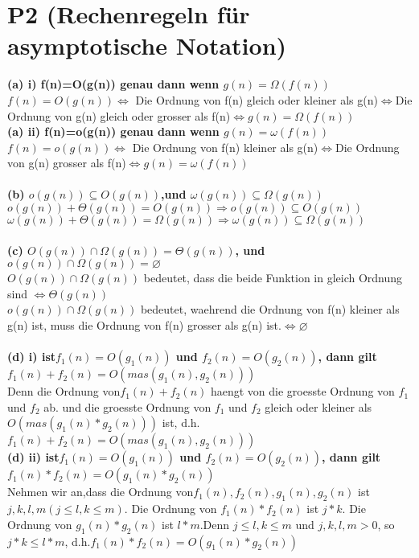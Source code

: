 \documentclass[a4paper,12pt]{article}
\begin{document}
\section{P2 (Rechenregeln für asymptotische Notation)}
\textbf{(a) i) f(n)=O(g(n)) genau dann wenn $g(n)=\Omega(f(n))$}\\
$f(n)=O(g(n))\Leftrightarrow$ Die Ordnung von f(n) gleich oder kleiner als g(n)$\Leftrightarrow$Die Ordnung von g(n) gleich oder grosser als f(n)$\Leftrightarrow g(n)=\Omega(f(n))$\\
\textbf{(a) ii) f(n)=o(g(n)) genau dann wenn $g(n)=\omega(f(n))$}\\
$f(n)=o(g(n))\Leftrightarrow$ Die Ordnung von f(n) kleiner als g(n)$\Leftrightarrow$Die Ordnung von g(n) grosser als f(n)$\Leftrightarrow g(n)=\omega(f(n))$\\
\\
\textbf{(b) $o(g(n))\subseteq O(g(n))$,und $\omega(g(n))\subseteq\Omega(g(n))$}\\
$o(g(n))+\Theta(g(n))=O(g(n))\Rightarrow o(g(n))\subseteq O(g(n))$\\
$\omega(g(n))+\Theta(g(n))=\Omega(g(n))\Rightarrow \omega(g(n))\subseteq \Omega(g(n))$\\
\\
\textbf{(c) $O(g(n))\cap\Omega(g(n))=\Theta(g(n))$, und $o(g(n))\cap\Omega(g(n))=\varnothing$}\\
$O(g(n))\cap\Omega(g(n))$ bedeutet, dass die beide Funktion in gleich Ordnung sind $\Leftrightarrow \Theta(g(n))$\\
$o(g(n))\cap\Omega(g(n))$ bedeutet, waehrend die Ordnung von f(n) kleiner als g(n) ist, muss die Ordnung von f(n) grosser als g(n) ist.$\Leftrightarrow \varnothing$\\
\\
\textbf{(d) i) ist$f_{1}(n)=O(g_{1}(n))$ und $f_{2}(n)=O(g_{2}(n))$, dann gilt $f_{1}(n)+f_{2}(n)=O(mas(g_{1}(n),g_{2}(n)))$}\\
Denn die Ordnung von$f_{1}(n)+f_{2}(n)$ haengt von die groesste Ordnung von $f_{1}$ und $f_{2}$ ab. und die groesste Ordnung von $f_{1}$ und $f_{2}$ gleich oder kleiner als $O(mas(g_{1}(n)*g_{2}(n)))$ ist, d.h.$f_{1}(n)+f_{2}(n)=O(mas(g_{1}(n),g_{2}(n)))$\\
\textbf{(d) ii) ist$f_{1}(n)=O(g_{1}(n))$ und $f_{2}(n)=O(g_{2}(n))$, dann gilt $f_{1}(n)*f_{2}(n)=O(g_{1}(n)*g_{2}(n))$}\\
Nehmen wir an,dass die Ordnung von$f_{1}(n),f_{2}(n),g_{1}(n),g_{2}(n)$ ist $j,k,l,m(j\le l,k\le m).$ Die Ordnung von $f_{1}(n)*f_{2}(n)$ ist $j*k.$ Die Ordnung von $g_{1}(n)*g_{2}(n)$ ist $l*m$.Denn $j\le l,k\le m$ und $j,k,l,m >0$, so $j*k\le l*m$, d.h.$f_{1}(n)*f_{2}(n)=O(g_{1}(n)*g_{2}(n))$\\
\end{document}
